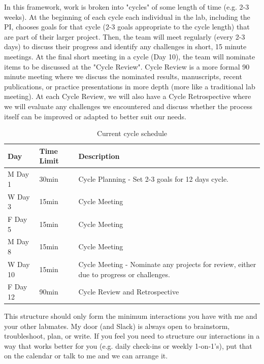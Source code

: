 \documentclass[10pt, a4paper, twocolumn]{article} %
\begin{document}
In this framework, work is broken into "cycles" of some length of time (e.g. 2-3 weeks). At the beginning of each cycle each individual in the lab, including the PI, chooses goals for that cycle (2-3 goals appropriate to the cycle length) that are part of their larger project. Then, the team will meet regularly (every 2-3 days) to discuss their progress and identify any challenges in short, 15 minute meetings. At the final short meeting in a cycle (Day 10), the team will nominate items to be discussed at the "Cycle Review". Cycle Review is a more formal 90 minute meeting where we discuss the nominated results, manuscripts, recent publications, or practice presentations in more depth (more like a traditional lab meeting). At each Cycle Review, we will also have a Cycle Retrospective where we will evaluate any challenges we encountered and discuss whether the process itself can be improved or adapted to better suit our needs.

\begin{table}
	\caption{Current cycle schedule}
	\centering
	\begin{tabular}{lll}
		\toprule
		\cmidrule(r){1-2}
		Day & Time Limit & Description \\
		\midrule
		M Day 1 & 30min & Cycle Planning - Set 2-3 goals for 12 days cycle. \\
		W Day 3 & 15min & Cycle Meeting  \\
		F Day 5 & 15min & Cycle Meeting \\
		M Day 8 & 15min & Cycle Meeting \\
		W Day 10 & 15min & Cycle Meeting - Nominate any projects for review, either due to progress or challenges.  \\
		F Day 12 & 90min & Cycle Review and Retrospective \\
		\bottomrule
	\end{tabular}
\end{table}

This structure should only form the minimum interactions you have with me and your other labmates. My door (and Slack) is always open to brainstorm, troubleshoot, plan, or write. If you feel you need to structure our interactions in a way that works better for you (e.g. daily check-ins or weekly 1-on-1's), put that on the calendar or talk to me and we can arrange it.
\end{document}

